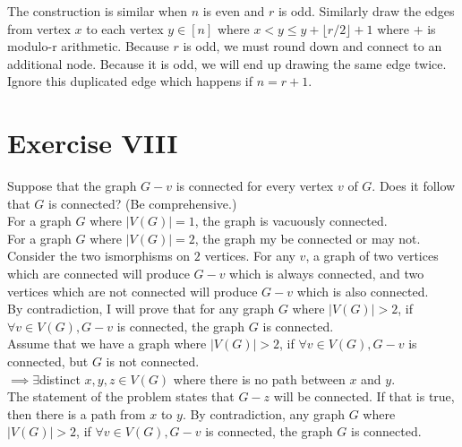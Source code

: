 \documentclass[fontsize=11pt]{scrartcl} %
\numberwithin{equation}{section} %
\numberwithin{figure}{section} %
\numberwithin{table}{section} %
\begin{document}
	The construction is similar when $n$ is even and $r$ is odd.  Similarly draw the edges from vertex $x$ to each vertex $y \in [n] $ where $x<y\leq y + \lfloor r/2 \rfloor + 1$ where $+$ is modulo-r arithmetic.  Because $r$ is odd, we must round down and connect to an additional node.  Because it is odd, we will end up drawing the same edge twice.  Ignore this duplicated edge which happens if $n = r + 1$.  

\section*{Exercise VIII}
Suppose that the graph $G-v$ is connected for every vertex $v$ of $G$.
Does it follow that $G$ is connected? (Be comprehensive.)\\

For a graph $G$ where $|V(G)| =1 $, the graph is vacuously connected.  \\ 
For a graph $G$ where $|V(G)| = 2 $, the graph my be connected or may not.  Consider the two ismorphisms on $2$ vertices.  For any $v$, a graph of two vertices which are connected will produce $G-v$ which is always connected, and two vertices which are not connected will produce $G-v$ which is also connected.  \\

By contradiction, I will prove that for any graph $G$ where $|V(G)| > 2$, if $\forall v \in V(G), G-v $ is connected, the graph $G$ is connected.  \\

Assume that we have a graph where $|V(G)| > 2$, if $\forall v \in V(G), G-v $ is connected, but $G$ is not connected.\\
$\implies \exists $distinct $x,y,z \in V(G) $ where there is no path between $x$ and $y$.  \\

The statement of the problem states that $G-z$ will be connected.  If that is true, then there is a path from $x$ to $y$.  By contradiction, any graph $G$ where $|V(G)| > 2$, if $\forall v \in V(G), G-v $ is connected, the graph $G$ is connected.
\end{document}

